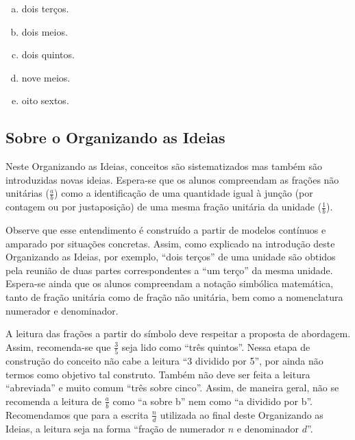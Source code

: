 \begin{multicols}{2}
\begin{orientacoes}

\end{orientacoes}

\begin{solucao}{}{}
  \begin{enumerate}[a)]
   \item dois terços.
   \item dois meios.
   \item dois quintos.
   \item nove meios.
   \item oito sextos.
\end{enumerate}
  \end{solucao}


\end{multicols}

\subsection{Sobre o Organizando as Ideias}



Neste Organizando as Ideias, conceitos são  sistematizados mas também são introduzidas novas ideias. Espera-se que os alunos compreendam as frações não unitárias ($\frac{a}{b}$) como a identificação de uma quantidade igual à junção (por contagem ou por justaposição) de uma mesma fração unitária da unidade ($\frac{1}{b}$). 

Observe que esse entendimento é construído a partir de modelos contínuos e amparado por situações concretas. Assim, como explicado na introdução deste Organizando as Ideias, por exemplo, ``dois terços'' de uma unidade são obtidos pela reunião de duas partes correspondentes a ``um terço'' da mesma unidade.
Espera-se ainda que os alunos compreendam a notação simbólica matemática, tanto de fração unitária como de fração não unitária, bem como a nomenclatura numerador e denominador. 

A leitura das frações a partir do símbolo deve respeitar a proposta de abordagem. Assim, recomenda-se que $\frac{3}{5}$ seja lido como ``três quintos''. Nessa etapa de construção do conceito não cabe a leitura ``3 dividido por 5'', por ainda não termos como objetivo tal construto.
Também não deve ser feita a leitura ``abreviada'' e muito comum ``três sobre cinco''. Assim, de maneira geral, não se recomenda a leitura de $\frac{a}{b}$ como ``a sobre b'' nem como ``a dividido por b''.
Recomendamos que para a escrita $\frac{n}{d}$ utilizada ao final deste Organizando as Ideias, a leitura seja na forma ``fração de numerador $n$ e denominador $d$''.

